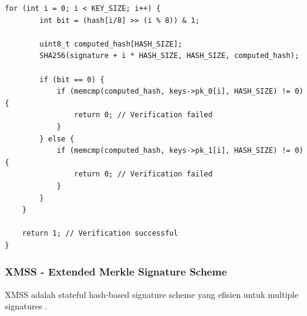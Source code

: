 \begin{lstlisting}[style=cstyle, caption={Lamport One-Time Signature}]
    for (int i = 0; i < KEY_SIZE; i++) {
        int bit = (hash[i/8] >> (i % 8)) & 1;
        
        uint8_t computed_hash[HASH_SIZE];
        SHA256(signature + i * HASH_SIZE, HASH_SIZE, computed_hash);
        
        if (bit == 0) {
            if (memcmp(computed_hash, keys->pk_0[i], HASH_SIZE) != 0) {
                return 0; // Verification failed
            }
        } else {
            if (memcmp(computed_hash, keys->pk_1[i], HASH_SIZE) != 0) {
                return 0; // Verification failed
            }
        }
    }
    
    return 1; // Verification successful
}
\end{lstlisting}

\subsubsection{XMSS - Extended Merkle Signature Scheme}

XMSS adalah stateful hash-based signature scheme yang efisien untuk multiple signatures \cite{bucha2011}.

